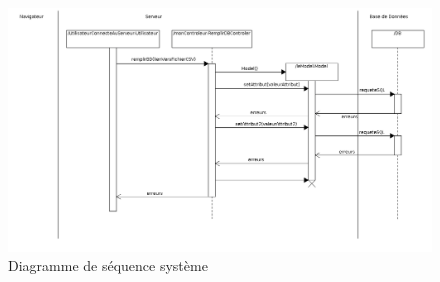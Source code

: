\begin{figure}[H]
	\centering
	\includegraphics[scale=0.3]{diagrammeSequence/images/diagrammeSequence}
	\caption{Diagramme de séquence système}	
	\label{diagramme_sequence}
\end{figure}
	
